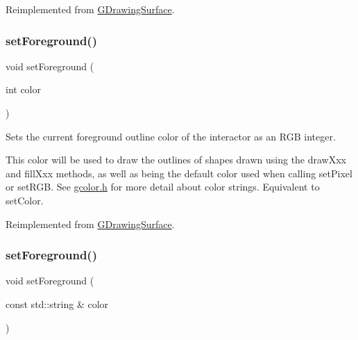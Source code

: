 Reimplemented from \mbox{\hyperlink{classGDrawingSurface_a8e096e8818d838aceae1d46d58fb3a7b}{G\+Drawing\+Surface}}.

\mbox{\label{classGCanvas_af9227e80cbfac55ce936fa5c99ffc954}} 
\subsubsection{\texorpdfstring{set\+Foreground()}{setForeground()}\hspace{0.1cm}{\footnotesize\ttfamily [1/2]}}
{\footnotesize\ttfamily void set\+Foreground (\begin{DoxyParamCaption}\item[{int}]{color }\end{DoxyParamCaption})\hspace{0.3cm}{\ttfamily [virtual]}}



Sets the current foreground outline color of the interactor as an R\+GB integer. 

This color will be used to draw the outlines of shapes drawn using the draw\+Xxx and fill\+Xxx methods, as well as being the default color used when calling set\+Pixel or set\+R\+GB. See \mbox{\hyperlink{gcolor_8h_source}{gcolor.\+h}} for more detail about color strings. Equivalent to set\+Color. 

Reimplemented from \mbox{\hyperlink{classGDrawingSurface_a7daa57084b5811b598fce8726660b328}{G\+Drawing\+Surface}}.

\mbox{\label{classGCanvas_a088e04dfc56273df4cedab2b11b970f5}} 
\subsubsection{\texorpdfstring{set\+Foreground()}{setForeground()}\hspace{0.1cm}{\footnotesize\ttfamily [2/2]}}
{\footnotesize\ttfamily void set\+Foreground (\begin{DoxyParamCaption}\item[{const std\+::string \&}]{color }\end{DoxyParamCaption})\hspace{0.3cm}{\ttfamily [virtual]}}



